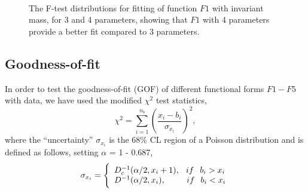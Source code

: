 \vspace{-0.3in}
\begin{figure}[htbp]
\begin{center}
 \\
\caption{The F-test distributions for fitting of function $F1$ with \bstar invariant mass, for 3 and 4 parameters, showing that $F1$ with 4 parameters provide a better fit compared to 3 parameters.}
\label{fig:ftest_b}
\end{center}
\end{figure}

\subsection{Goodness-of-fit}
In order to test the goodness-of-fit (GOF) of different functional forms $F1-F5$ with data, we have used the modified $\chi^{2}$ test statistics, 
\begin{equation}
\chi^{2} = \sum_{i=1}^{n_{b}} \left({\frac{x_{i} - b_{i}}{\sigma_{x_{i}}}}\right)^{2},
\label{eq:chi2}
\end{equation}
where the ``uncertainty'' $\sigma_{x_{i}}$ is the 68$\%$ CL region of a Poisson distribution and is defined as follows, setting $\alpha$ = 1 - 0.687,
\begin{equation}
\sigma_{x_{i}} = \Bigg\{
                    \begin{array}{ll}                           
                      D_{c}^{-1}(\alpha/2, x_{i}+1),\hspace{0.1in} if \hspace{0.1 in} b_{i} > x_{i} \\
                      D^{-1}(\alpha/2, x_{i}),\hspace{0.35 in} if \hspace{0.1 in} b_{i} < x_{i}
                    \end{array}
\end{equation}

